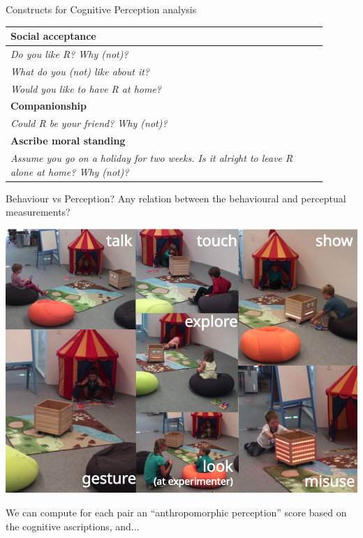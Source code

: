 \documentclass[handout,compress]{beamer}
\begin{document}
{\begin{frame}{Constructs for Cognitive Perception analysis}
\begin{multicols}{2}
\begin{table}[]
\begin{tabularx}{\linewidth}{p{0.9\linewidth}}
    \toprule
    {\bf Social acceptance} \tabularnewline
    \midrule


    \emph{Do you like R? Why (not)?} \tabularnewline
    \emph{What do you (not) like about it?} \tabularnewline
    \emph{Would you like to have R at home?} \tabularnewline

    \toprule
    {\bf Companionship} \tabularnewline
    \midrule


    \emph{Could R be your friend? Why (not)?}\tabularnewline

    \toprule
    {\bf Ascribe moral standing} \tabularnewline
    \midrule


    \emph{Assume you go on a holiday for two weeks. Is it alright to leave R
    alone at home? Why (not)?} \tabularnewline


            \bottomrule
        \end{tabularx}
        \label{tab:options}
    \end{table}
    \end{multicols}

\end{frame}
}


{

\begin{frame}{Behaviour vs Perception?}
    \centering
    Any relation between the behavioural and perceptual measurements?

    \includegraphics[width=0.5\linewidth]{ranger/interactions}

    We can compute for each pair an ``anthropomorphic perception'' score based on
    the cognitive ascriptions, and...
\end{frame}

}

\end{document}
